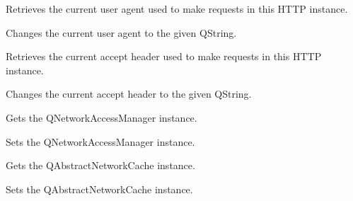 Retrieves the current user agent used to make requests in this H\+T\+TP instance.

Changes the current user agent to the given Q\+String.

Retrieves the current accept header used to make requests in this H\+T\+TP instance.

Changes the current accept header to the given Q\+String.

Gets the Q\+Network\+Access\+Manager instance.

Sets the Q\+Network\+Access\+Manager instance.

Gets the Q\+Abstract\+Network\+Cache instance.

Sets the Q\+Abstract\+Network\+Cache instance. 